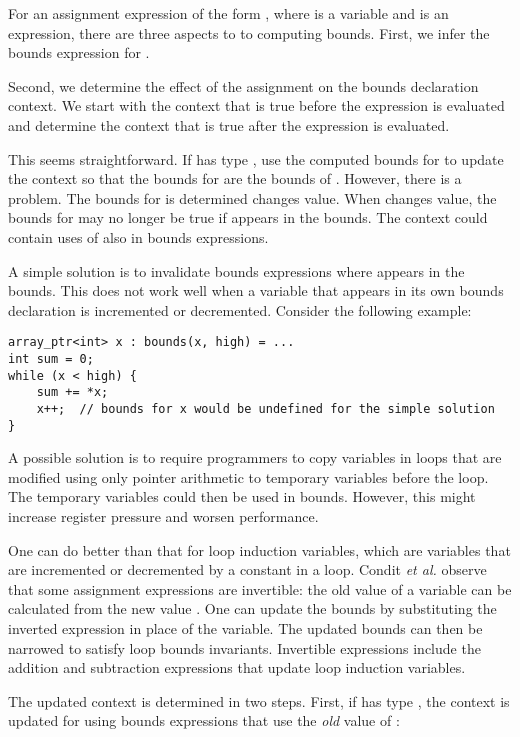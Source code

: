 For an assignment expression of the form  \code{=} ,
where  is a variable and  is an expression, there are
three aspects to to computing bounds.   First, we infer the
bounds expression for .

Second, we determine the effect of the assignment on the
bounds declaration context.
We start with the context that is true before the expression
is evaluated and determine the context that is true after
the expression is evaluated.

This seems straightforward.  If  has type
\arrayptr, use the computed bounds for  to update the context
so that the bounds for  are the bounds of .
However, there is a problem. The bounds for  is determined
  changes value. When  changes value, the bounds
for  may no longer be true if  appears in the bounds.
The context could contain uses of  also in bounds expressions.

A simple solution is to invalidate bounds expressions where  appears in
the bounds. This does not work well when a variable that appears in its
own bounds declaration is incremented or decremented. Consider the
following example:
\begin{lstlisting}
array_ptr<int> x : bounds(x, high) = ...
int sum = 0;
while (x < high) {
    sum += *x;
    x++;  // bounds for x would be undefined for the simple solution
}
\end{lstlisting}

A possible solution is to require programmers to copy variables in loops
that are modified using only pointer arithmetic to temporary variables
before the loop. The temporary variables could then be used in bounds.
However, this might increase register pressure and worsen performance.

One can do better than that for loop induction variables, which are
variables that are incremented or decremented by a constant in a loop.
Condit \textit{et al.} observe that some assignment expressions are
invertible: the old value of a variable can be calculated from the new
value . One can update the bounds by substituting the inverted
expression in place of the variable. The updated bounds can then be
narrowed to satisfy loop bounds invariants. Invertible expressions
include the addition and subtraction expressions that update loop
induction variables.

The updated context is determined in two steps. First, if
 has type \arrayptr, the context is updated for
 using bounds expressions that use the \emph{old} value of :

